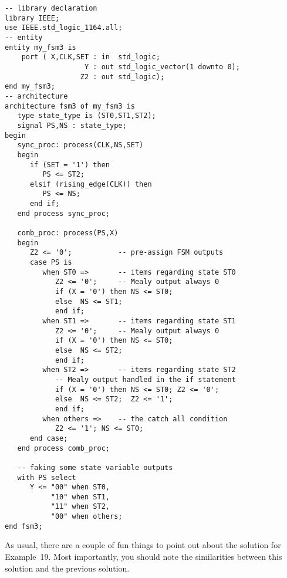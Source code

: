 \noindent
\begin{minipage}{0.99\linewidth}
\begin{lstlisting}[label=exe_19_code, caption=Solution to Example~19.]
-- library declaration
library IEEE;
use IEEE.std_logic_1164.all;
-- entity
entity my_fsm3 is 
    port ( X,CLK,SET : in  std_logic; 
                   Y : out std_logic_vector(1 downto 0); 
                  Z2 : out std_logic); 
end my_fsm3;
-- architecture
architecture fsm3 of my_fsm3 is
   type state_type is (ST0,ST1,ST2); 
   signal PS,NS : state_type; 
begin
   sync_proc: process(CLK,NS,SET)
   begin
      if (SET = '1') then 
         PS <= ST2; 
      elsif (rising_edge(CLK)) then 
         PS <= NS; 
      end if; 
   end process sync_proc; 

   comb_proc: process(PS,X)
   begin
      Z2 <= '0';           -- pre-assign FSM outputs
      case PS is 
         when ST0 =>       -- items regarding state ST0
            Z2 <= '0';     -- Mealy output always 0
            if (X = '0') then NS <= ST0;  
            else  NS <= ST1; 
            end if; 
         when ST1 =>       -- items regarding state ST1
            Z2 <= '0';     -- Mealy output always 0
            if (X = '0') then NS <= ST0; 
            else  NS <= ST2; 
            end if; 
         when ST2 =>       -- items regarding state ST2
            -- Mealy output handled in the if statement
            if (X = '0') then NS <= ST0; Z2 <= '0'; 
            else  NS <= ST2;  Z2 <= '1';     
            end if; 
         when others =>    -- the catch all condition
            Z2 <= '1'; NS <= ST0; 
      end case; 
   end process comb_proc; 
 
   -- faking some state variable outputs
   with PS select
      Y <= "00" when ST0, 
           "10" when ST1, 
           "11" when ST2, 
           "00" when others; 
end fsm3;
\end{lstlisting}
\end{minipage}

As usual, there are a couple of fun things to point out about the solution for Example~19. Most importantly, you should note the similarities between this solution and the previous solution. 

